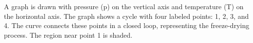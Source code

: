 A graph is drawn with pressure (p) on the vertical axis and temperature (T) on the horizontal axis. The graph shows a cycle with four labeled points: 1, 2, 3, and 4. The curve connects these points in a closed loop, representing the freeze-drying process. The region near point 1 is shaded.